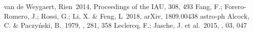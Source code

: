\documentclass[manuscript]{aastex62}
\begin{document}


\section*{}
\nocite{*}




\begin{thebibliography}{}                                                       

 van de Weygaert, Rien\ 2014, Proceedings of the IAU, 308, 493   
 Fang, F.; Forero-Romero, J.; Rossi, G.; Li, X. \& Feng, L\ 2018, arXiv, 1809.00438 astro-ph
 Alcock, C. \& Paczy\'nski, B.\ 1979, \nat, 281, 358
 Leclercq, F.; Jasche, J. et al.\ 2015, \jcap, 03, 047
                                                                                
\end{thebibliography}                                                           
                       



\end{document}
